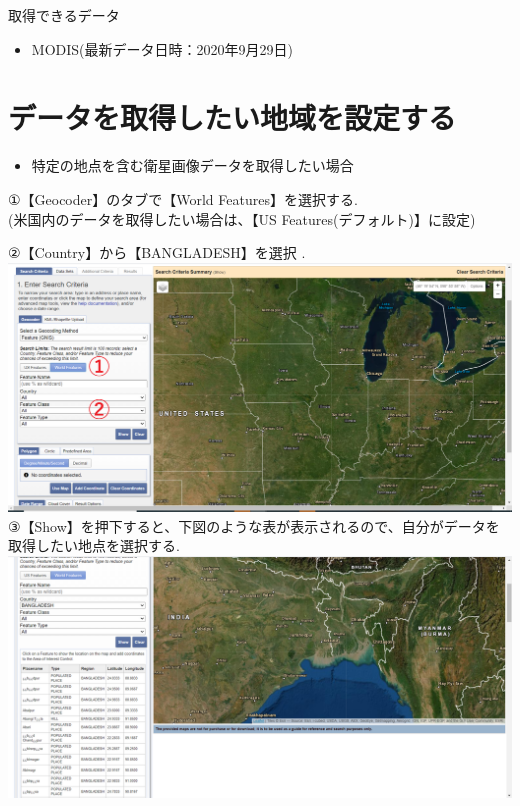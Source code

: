 \documentclass[
]{book}
\providecommand{\tightlist}{%
  \setlength{\itemsep}{0pt}\setlength{\parskip}{0pt}}
\begin{document}
取得できるデータ

\begin{itemize}
\tightlist
\item
  MODIS(最新データ日時：2020年9月29日)
\end{itemize}

\hypertarget{ux30c7ux30fcux30bfux3092ux53d6ux5f97ux3057ux305fux3044ux5730ux57dfux3092ux8a2dux5b9aux3059ux308b}{%
\section{データを取得したい地域を設定する}\label{ux30c7ux30fcux30bfux3092ux53d6ux5f97ux3057ux305fux3044ux5730ux57dfux3092ux8a2dux5b9aux3059ux308b}}

\begin{itemize}
\tightlist
\item
  特定の地点を含む衛星画像データを取得したい場合
\end{itemize}

①【Geocoder】のタブで【World Features】を選択する.\\
(米国内のデータを取得したい場合は、【US Features(デフォルト)】に設定)

②【Country】から【BANGLADESH】を選択 .\\
\includegraphics{images/area1.png}
③【Show】を押下すると、下図のような表が表示されるので、自分がデータを取得したい地点を選択する.
\includegraphics{images/table1.png}
\end{document}
